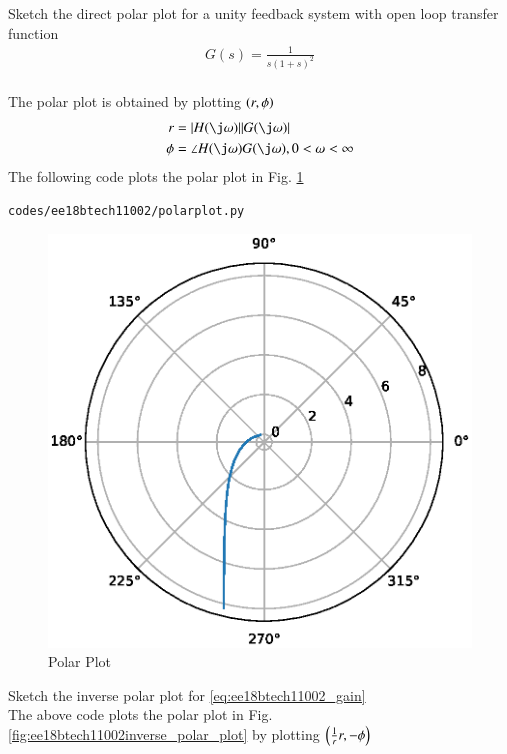 Sketch the direct polar plot for a unity feedback system with open loop transfer function
\begin{align}
\label{eq:ee18btech11002_gain}
G(s) = \frac{1}{s(1+s)^2}
\end{align}
\\
\solution  
The polar plot is obtained by plotting $\left(r,\phi\right)$
\begin{align}
r&=|H(\j\omega)||G(\j\omega)|
\\
\phi&=\angle H(\j\omega)G(\j\omega), 0 < \omega < \infty
\end{align}
The following code plots the polar plot in Fig. \ref{fig:ee18btech11002polar_plot}

\begin{lstlisting}
codes/ee18btech11002/polarplot.py
\end{lstlisting}
\begin{figure}[!ht]
\centering
\includegraphics[width=\columnwidth]{./figs/ee18btech11002/ee18btech11002.eps}
\caption{Polar Plot}
\label{fig:ee18btech11002polar_plot}
\end{figure}
Sketch the inverse polar plot for \eqref{eq:ee18btech11002_gain}
\\
\solution The above code plots the polar plot in Fig. \ref{fig:ee18btech11002inverse_polar_plot} by plotting  $\left(\frac{1}{r}r,-\phi\right)$

